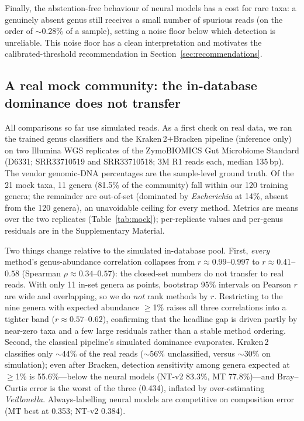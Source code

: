 Finally, the abstention-free behaviour of neural models has a cost for rare
taxa: a genuinely absent genus still receives a small number of spurious reads
(on the order of $\sim$0.28\% of a sample), setting a noise floor below which
detection is unreliable. This noise floor has a clean interpretation and
motivates the calibrated-threshold recommendation in
Section~\ref{sec:recommendations}.

\subsection{A real mock community: the in-database dominance does not transfer}
\label{sec:mock}

All comparisons so far use simulated reads. As a first check on real data, we
ran the trained genus classifiers and the Kraken\,2$+$Bracken pipeline
(inference only) on two Illumina WGS replicates of the ZymoBIOMICS Gut
Microbiome Standard (D6331; SRR33710519 and SRR33710518; 3M R1 reads each,
median 135\,bp). The vendor genomic-DNA percentages are the sample-level ground
truth. Of the 21 mock taxa, 11 genera (81.5\% of the community) fall within our
120 training genera; the remainder are out-of-set (dominated by
\emph{Escherichia} at 14\%, absent from the 120 genera), an unavoidable ceiling
for every method. Metrics are means over the two replicates
(Table~\ref{tab:mock}); per-replicate values and per-genus residuals are in the
Supplementary Material.

Two things change relative to the simulated in-database pool. First,
\emph{every} method's genus-abundance correlation collapses from
$r\approx0.99$--$0.997$ to $r\approx0.41$--$0.58$ (Spearman
$\rho\approx0.34$--$0.57$): the closed-set numbers do not transfer to real
reads. With only 11 in-set genera as points, bootstrap 95\% intervals on Pearson
$r$ are wide and overlapping, so we do \emph{not} rank methods by $r$.
Restricting to the nine genera with expected abundance $\ge$1\% raises all three
correlations into a tighter band ($r\approx0.57$--$0.62$), confirming that the
headline gap is driven partly by near-zero taxa and a few large residuals rather
than a stable method ordering. Second, the classical pipeline's simulated
dominance evaporates. Kraken\,2 classifies only $\sim$44\% of the real reads
($\sim$56\% unclassified, versus $\sim$30\% on simulation); even after Bracken,
detection sensitivity among genera expected at $\ge$1\% is 55.6\%---below the
neural models (NT-v2 83.3\%, MT 77.8\%)---and Bray--Curtis error is the worst of
the three (0.434), inflated by over-estimating \emph{Veillonella}. Always-labelling
neural models are competitive on composition error (MT best at 0.353; NT-v2
0.384).

